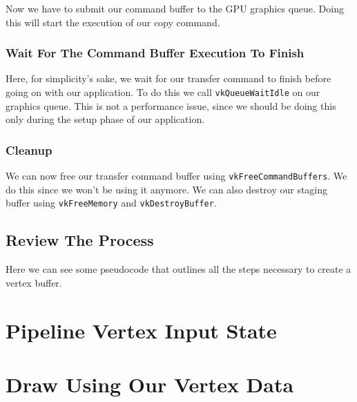 Now we have to submit our command buffer to the GPU graphics queue.
Doing this will start the execution of our copy command.

\begin{minipage}{\linewidth}{\noindent}
    
\end{minipage}

\subsubsection{Wait For The Command Buffer Execution To Finish}

Here, for simplicity's sake, we wait for our transfer command to finish
before going on with our application.
To do this we call \texttt{vkQueueWaitIdle} on our graphics queue.
This is not a performance issue, since we should be doing this
only during the setup phase of our application.

\subsubsection{Cleanup}

We can now free our transfer command buffer using \texttt{vkFreeCommandBuffers}.
We do this since we won't be using it anymore.
We can also destroy our staging buffer using \texttt{vkFreeMemory}
and \texttt{vkDestroyBuffer}.

\subsection{Review The Process}

Here we can see some pseudocode that outlines all the steps necessary to
create a vertex buffer.

\begin{minipage}{\linewidth}{\noindent}
    
\end{minipage}

\section{Pipeline Vertex Input State}

\section{Draw Using Our Vertex Data}
